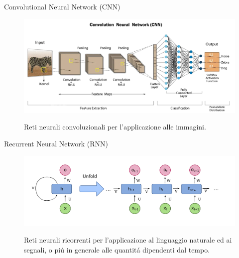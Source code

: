 \documentclass[aspectratio=169]{beamer}
\begin{document}
\begin{frame}{Convolutional Neural Network (CNN)}
\begin{figure}
    \begin{minipage}{0.7\textwidth}
        \centering
        \includegraphics[width=\textwidth]{architectures/CNN.png}
    \end{minipage}%
    \begin{minipage}{0.3\textwidth}
        \centering
        Reti neurali convoluzionali per l'applicazione alle immagini.
    \end{minipage}
\end{figure}
\end{frame}

\begin{frame}{Recurrent Neural Network (RNN)}
    \begin{figure}
        \begin{minipage}{0.7\textwidth}
            \centering
            \includegraphics[width=\textwidth]{architectures/RNN.png}
        \end{minipage}%
        \begin{minipage}{0.3\textwidth}
            \centering
            Reti neurali ricorrenti per l'applicazione al linguaggio naturale ed ai segnali, o pi\'u in generale alle quantit\'a dipendenti dal tempo.
        \end{minipage}
    \end{figure}
\end{frame}
\end{document}
